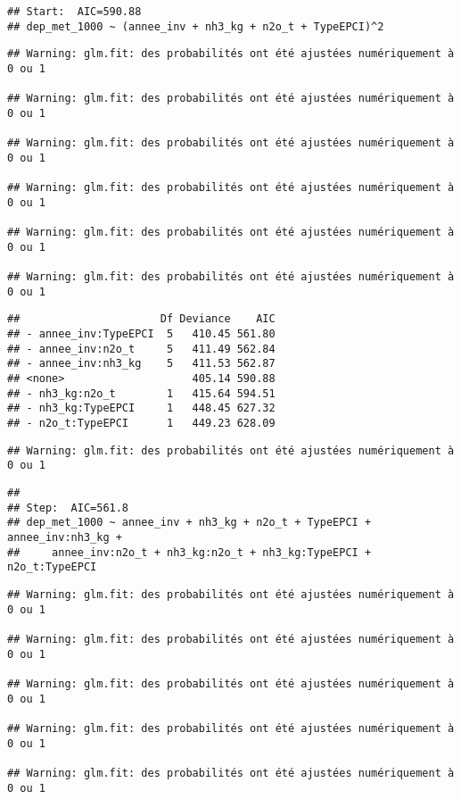 \documentclass[
]{article}
\begin{document}
\begin{verbatim}
## Start:  AIC=590.88
## dep_met_1000 ~ (annee_inv + nh3_kg + n2o_t + TypeEPCI)^2
\end{verbatim}

\begin{verbatim}
## Warning: glm.fit: des probabilités ont été ajustées numériquement à 0 ou 1

## Warning: glm.fit: des probabilités ont été ajustées numériquement à 0 ou 1

## Warning: glm.fit: des probabilités ont été ajustées numériquement à 0 ou 1

## Warning: glm.fit: des probabilités ont été ajustées numériquement à 0 ou 1

## Warning: glm.fit: des probabilités ont été ajustées numériquement à 0 ou 1

## Warning: glm.fit: des probabilités ont été ajustées numériquement à 0 ou 1
\end{verbatim}

\begin{verbatim}
##                      Df Deviance    AIC
## - annee_inv:TypeEPCI  5   410.45 561.80
## - annee_inv:n2o_t     5   411.49 562.84
## - annee_inv:nh3_kg    5   411.53 562.87
## <none>                    405.14 590.88
## - nh3_kg:n2o_t        1   415.64 594.51
## - nh3_kg:TypeEPCI     1   448.45 627.32
## - n2o_t:TypeEPCI      1   449.23 628.09
\end{verbatim}

\begin{verbatim}
## Warning: glm.fit: des probabilités ont été ajustées numériquement à 0 ou 1
\end{verbatim}

\begin{verbatim}
## 
## Step:  AIC=561.8
## dep_met_1000 ~ annee_inv + nh3_kg + n2o_t + TypeEPCI + annee_inv:nh3_kg + 
##     annee_inv:n2o_t + nh3_kg:n2o_t + nh3_kg:TypeEPCI + n2o_t:TypeEPCI
\end{verbatim}

\begin{verbatim}
## Warning: glm.fit: des probabilités ont été ajustées numériquement à 0 ou 1

## Warning: glm.fit: des probabilités ont été ajustées numériquement à 0 ou 1

## Warning: glm.fit: des probabilités ont été ajustées numériquement à 0 ou 1

## Warning: glm.fit: des probabilités ont été ajustées numériquement à 0 ou 1

## Warning: glm.fit: des probabilités ont été ajustées numériquement à 0 ou 1
\end{verbatim}
\end{document}
